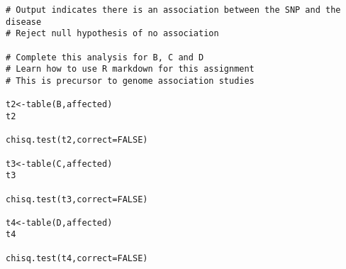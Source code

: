 \documentclass[11 pt,letterpaper]{article}
\begin{document}
\begin{appendix}
\begin{lstlisting}
# Output indicates there is an association between the SNP and the disease
# Reject null hypothesis of no association

# Complete this analysis for B, C and D
# Learn how to use R markdown for this assignment
# This is precursor to genome association studies

t2<-table(B,affected)
t2

chisq.test(t2,correct=FALSE)

t3<-table(C,affected)
t3

chisq.test(t3,correct=FALSE)

t4<-table(D,affected)
t4

chisq.test(t4,correct=FALSE)

\end{lstlisting}

\end{appendix}
\end{document}
